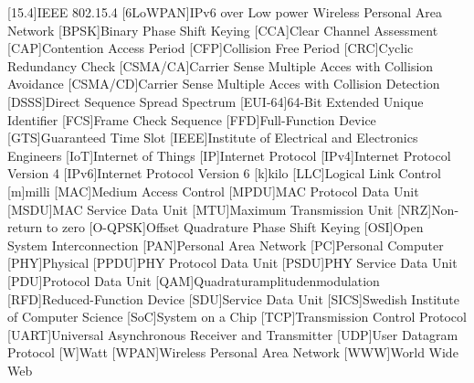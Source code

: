 \begin{acronym}[6LoWPAN]
	[15.4]{IEEE 802.15.4}
	[6LoWPAN]{IPv6 over Low power Wireless Personal Area Network}
	[BPSK]{Binary Phase Shift Keying}
	[CCA]{Clear Channel Assessment}
	[CAP]{Contention Access Period}
	[CFP]{Collision Free Period}
	[CRC]{Cyclic Redundancy Check}
	[CSMA/CA]{Carrier Sense Multiple Acces with Collision Avoidance}
	[CSMA/CD]{Carrier Sense Multiple Acces with Collision Detection}
	[DSSS]{Direct Sequence Spread Spectrum}
	[EUI-64]{64-Bit Extended Unique Identifier}
	[FCS]{Frame Check Sequence}
	[FFD]{Full-Function Device}
	[GTS]{Guaranteed Time Slot}
	[IEEE]{Institute of Electrical and Electronics Engineers}
	[IoT]{Internet of Things}
	[IP]{Internet Protocol}
	[IPv4]{Internet Protocol Version 4}
	[IPv6]{Internet Protocol Version 6}
	{kilo}
	[LLC]{Logical Link Control}
	{milli}
	[MAC]{Medium Access Control}
	[MPDU]{MAC Protocol Data Unit}
	[MSDU]{MAC Service Data Unit}
	[MTU]{Maximum Transmission Unit}
	[NRZ]{Non-return to zero}
	[O-QPSK]{Offset Quadrature Phase Shift Keying}
	[OSI]{Open System Interconnection}
	[PAN]{Personal Area Network}
	[PC]{Personal Computer}
	[PHY]{Physical}
	[PPDU]{PHY Protocol Data Unit}
	[PSDU]{PHY Service Data Unit}
	[PDU]{Protocol Data Unit}
	[QAM]{Quadraturamplitudenmodulation}
	[RFD]{Reduced-Function Device}
	[SDU]{Service Data Unit}
	[SICS]{Swedish Institute of Computer Science}
	[SoC]{System on a Chip}
	[TCP]{Transmission Control Protocol}
	[UART]{Universal Asynchronous Receiver and Transmitter}
	[UDP]{User Datagram Protocol}
	{Watt}
	[WPAN]{Wireless Personal Area Network}
	[WWW]{World Wide Web}
\end{acronym}